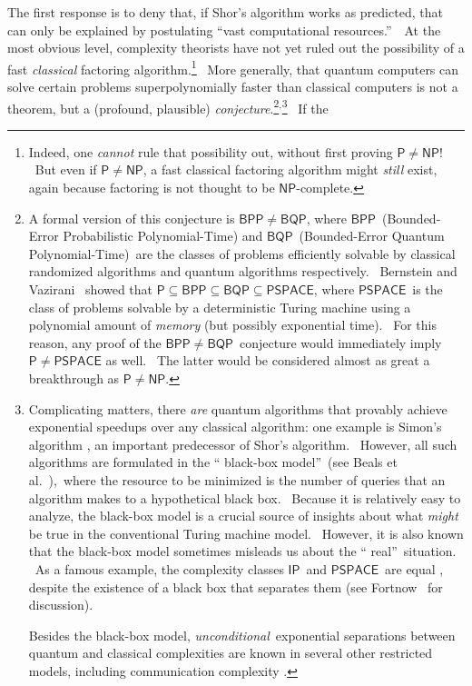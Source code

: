 \documentclass[11pt,onecolumn]{article}%
\begin{document}
The first response is to deny that, if Shor's algorithm works as predicted,
that can only be explained by postulating \textquotedblleft vast computational
resources.\textquotedblright\ \ At the most obvious level, complexity
theorists have not yet ruled out the possibility of a fast \textit{classical}
factoring algorithm.\footnote{Indeed, one \textit{cannot} rule that
possibility out, without first proving $\mathsf{P}\neq\mathsf{NP}$! \ But even
if $\mathsf{P}\neq\mathsf{NP}$, a fast classical factoring algorithm might
\textit{still} exist, again because factoring is not thought to be
$\mathsf{NP}$-complete.} \ More generally, that quantum computers can solve
certain problems superpolynomially faster than classical computers is not a
theorem, but a (profound, plausible) \textit{conjecture}.\footnote{A formal
version of this conjecture is $\mathsf{BPP}\neq\mathsf{BQP}$, where
$\mathsf{BPP}$\ (Bounded-Error Probabilistic Polynomial-Time) and
$\mathsf{BQP}$\ (Bounded-Error Quantum Polynomial-Time)\ are the classes of
problems efficiently solvable by classical randomized algorithms and quantum
algorithms respectively. \ Bernstein and Vazirani \cite{bv}\ showed that
$\mathsf{P}\subseteq\mathsf{BPP}\subseteq\mathsf{BQP}\subseteq\mathsf{PSPACE}%
$, where $\mathsf{PSPACE}$\ is the class of problems solvable by a
deterministic Turing machine using a polynomial amount of \textit{memory} (but
possibly exponential time). \ For this reason, any proof of the $\mathsf{BPP}%
\neq\mathsf{BQP}$\ conjecture would immediately imply $\mathsf{P}%
\neq\mathsf{PSPACE}$ as well. \ The latter would be considered almost as great
a breakthrough as $\mathsf{P}\neq\mathsf{NP}$.}$^{,}$\footnote{Complicating
matters, there \textit{are} quantum algorithms that provably achieve
exponential speedups over any classical algorithm: one example is Simon's
algorithm \cite{simon}, an important predecessor of Shor's algorithm.
\ However, all such algorithms are formulated in the \textquotedblleft
black-box model\textquotedblright\ (see Beals et al.\ \cite{bbcmw}),\ where
the resource to be minimized is the number of queries that an algorithm makes
to a hypothetical black box. \ Because it is relatively easy to analyze, the
black-box model is a crucial source of insights about what \textit{might} be
true in the conventional Turing machine model. \ However, it is also known
that the black-box model sometimes misleads us about the \textquotedblleft
real\textquotedblright\ situation. \ As a famous example, the complexity
classes $\mathsf{IP}$\ and $\mathsf{PSPACE}$\ are equal \cite{shamir}, despite
the existence of a black box that separates them (see Fortnow
\cite{fortnow:rel}\ for discussion).
\par
Besides the black-box model, \textit{unconditional}\ exponential separations
between quantum and classical complexities are known in several other
restricted models, including communication complexity \cite{raz:cc}.} \ If the
\end{document}
